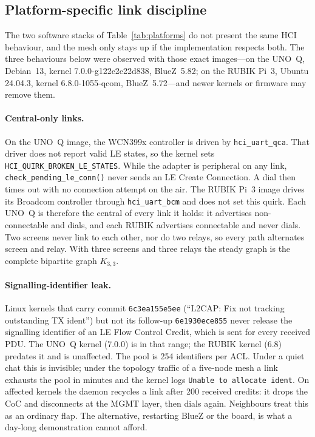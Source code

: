 \documentclass[conference,10pt]{IEEEtran}
\begin{document}
\subsection{Platform-specific link discipline}
\label{sec:controller}

The two software stacks of Table~\ref{tab:platforms} do not present the
same HCI behaviour, and the mesh only stays up if the implementation
respects both. The three behaviours below were observed with those exact
images---on the UNO~Q, Debian~13, kernel 7.0.0-g122c2c22d838, BlueZ~5.82;
on the RUBIK Pi~3, Ubuntu 24.04.3, kernel 6.8.0-1055-qcom,
BlueZ~5.72---and newer kernels or firmware may remove them.

\paragraph{Central-only links.}
On the UNO~Q image, the WCN399x controller is driven by
\texttt{hci\_uart\_qca}. That driver does not report valid LE states, so
the kernel sets \texttt{HCI\_QUIRK\_BROKEN\_LE\_STATES}. While the adapter
is peripheral on any link, \texttt{check\_pending\_le\_conn()} never sends
an LE Create Connection. A dial then times out with no connection attempt
on the air. The RUBIK Pi~3 image drives its Broadcom controller through
\texttt{hci\_uart\_bcm} and does not set this quirk. Each UNO~Q is
therefore the central of every link it holds: it advertises
non-connectable and dials, and each RUBIK advertises connectable and
never dials. Two screens never link to each other, nor do two relays, so
every path alternates screen and relay. With three screens and three
relays the steady graph is the complete bipartite graph $K_{3,3}$.

\paragraph{Signalling-identifier leak.}
Linux kernels that carry commit \texttt{6c3ea155e5ee} (``L2CAP: Fix not
tracking outstanding TX ident'') but not its follow-up
\texttt{6e1930ece855} never release the signalling identifier of an LE
Flow Control Credit, which is sent for every received PDU. The UNO~Q
kernel (7.0.0) is in that range; the RUBIK kernel (6.8) predates it and
is unaffected. The pool is 254 identifiers per ACL. Under a quiet chat
this is invisible; under the topology traffic of a five-node mesh a link
exhausts the pool in minutes and the kernel logs \texttt{Unable to
allocate ident}. On affected kernels the daemon recycles a link after 200
received credits: it drops the CoC and disconnects at the MGMT layer,
then dials again. Neighbours treat this as an ordinary flap. The
alternative, restarting BlueZ or the board, is what a day-long
demonstration cannot afford.
\end{document}
